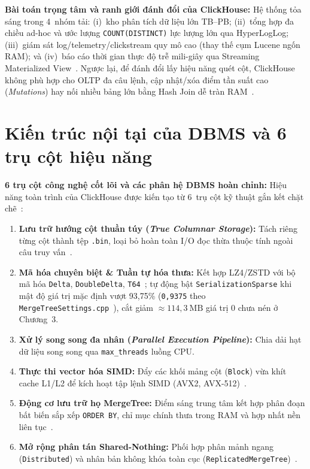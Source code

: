 \documentclass[13pt,a4paper]{report}
\begin{document}
\vspace{0.2cm}
\noindent\textbf{Bài toán trọng tâm và ranh giới đánh đổi của ClickHouse:} Hệ thống tỏa sáng trong 4~nhóm tải: (i)~kho phân tích dữ liệu lớn TB--PB; (ii)~tổng hợp đa chiều ad-hoc và ước lượng \texttt{COUNT(\allowbreak{}DISTINCT)} lực lượng lớn qua HyperLogLog; (iii)~giám sát log/telemetry/clickstream quy mô cao (thay thế cụm Lucene ngốn RAM); và (iv)~báo cáo thời gian thực độ trễ mili-giây qua Streaming Materialized View~\cite{A1, B2, S14}. Ngược lại, để đánh đổi lấy hiệu năng quét cột, ClickHouse không phù hợp cho OLTP đa câu lệnh, cập nhật/xóa điểm tần suất cao (\textit{Mutations}) hay nối nhiều bảng lớn bằng Hash Join dễ tràn RAM~\cite{A1, S2}.

\section{Kiến trúc nội tại của DBMS và 6 trụ cột hiệu năng}
\noindent\textbf{6 trụ cột công nghệ cốt lõi và các phân hệ DBMS hoàn chỉnh:}
Hiệu năng toàn trình của ClickHouse được kiến tạo từ 6~trụ cột kỹ thuật gắn kết chặt chẽ~\cite{A1, S1}:
\begin{enumerate}
    \setlength{\itemsep}{3pt}\setlength{\parskip}{0pt}\setlength{\parsep}{0pt}
    \item \textbf{Lưu trữ hướng cột thuần túy (\textit{True Columnar Storage}):} Tách riêng từng cột thành tệp \texttt{.bin}, loại bỏ hoàn toàn I/O đọc thừa thuộc tính ngoài câu truy vấn~\cite{A2}.
    \item \textbf{Mã hóa chuyên biệt \& Tuần tự hóa thưa:} Kết hợp LZ4/ZSTD với bộ mã hóa \texttt{Delta}, \texttt{DoubleDelta}, \texttt{T64}~\cite{S16}; tự động bật \texttt{SerializationSparse} khi mật độ giá trị mặc định vượt 93,75\% (\texttt{0,9375} theo \texttt{MergeTreeSettings.cpp}~\cite{S13}), cắt giảm $\approx 114{,}3~\text{MB}$ giá trị 0 chưa nén ở Chương~3.
    \item \textbf{Xử lý song song đa nhân (\textit{Parallel Execution Pipeline}):} Chia dải hạt dữ liệu song song qua \texttt{max\_\allowbreak{}threads} luồng CPU.
    \item \textbf{Thực thi vector hóa SIMD:} Đẩy các khối mảng cột (\texttt{Block}) vừa khít cache L1/L2 để kích hoạt tập lệnh SIMD (AVX2, AVX-512)~\cite{A1, A2}.
    \item \textbf{Động cơ lưu trữ họ MergeTree:} Điểm sáng trung tâm kết hợp phân đoạn bất biến sắp xếp \texttt{ORDER BY}, chỉ mục chính thưa trong RAM và hợp nhất nền liên tục~\cite{A1, S2}.
    \item \textbf{Mở rộng phân tán Shared-Nothing:} Phối hợp phân mảnh ngang (\texttt{Distributed}) và nhân bản không khóa toàn cục (\texttt{ReplicatedMergeTree})~\cite{A1, S17}.
\end{enumerate}
\end{document}
